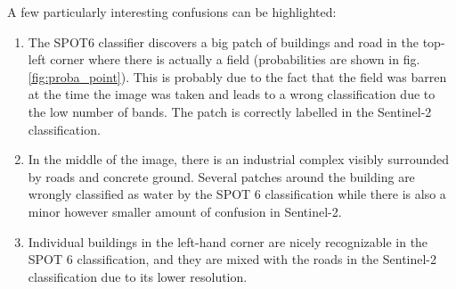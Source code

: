 \documentclass[10pt]{article}
\begin{document}
A few particularly interesting confusions can be highlighted:
\begin{enumerate}
    \item The SPOT6 classifier discovers a big patch of buildings and road in the top-left corner where there is actually a field (probabilities are shown in fig. \ref{fig:proba_point}). This is probably due to the fact that the field was barren at the time the image was taken and leads to a wrong classification due to the low number of bands. The patch is correctly labelled in the Sentinel-2 classification.
    \item In the middle of the image, there is an industrial complex visibly surrounded by roads and concrete ground. Several patches around the building are wrongly classified as water by the SPOT 6 classification while there is also a minor however smaller amount of confusion in Sentinel-2.
    \item Individual buildings in the left-hand corner are nicely recognizable in the SPOT 6 classification, and they are mixed with the roads in the Sentinel-2 classification due to its lower resolution.
\end{enumerate}
\end{document}
